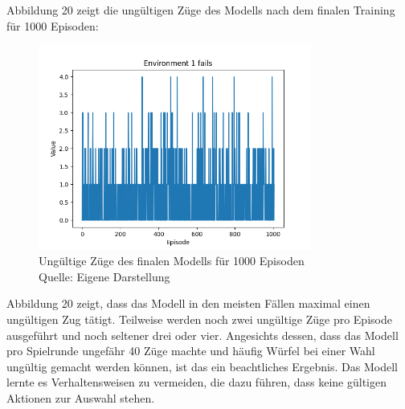 Abbildung 20 zeigt die ungültigen Züge des Modells nach dem finalen Training für 1000 Episoden:
\nopagebreak
\begin{figure}[H]
	\centering
	\includegraphics[width=0.8\textwidth]{Bilder/maskableppo_ganzschoenclever_193avg_v3.1f}
	\caption[Ungültige Züge des finalen Modells für 1000 Episoden]{Ungültige Züge des finalen Modells für 1000 Episoden\\ Quelle: Eigene Darstellung}
\end{figure}

Abbildung 20 zeigt, dass das Modell in den meisten Fällen maximal einen ungültigen Zug tätigt. Teilweise werden noch zwei ungültige Züge pro Episode ausgeführt und noch seltener drei oder vier. Angesichts dessen, dass das Modell pro Spielrunde ungefähr 40 Züge machte und häufig Würfel bei einer Wahl ungültig gemacht werden können, ist das ein beachtliches Ergebnis. Das Modell lernte es Verhaltensweisen zu vermeiden, die dazu führen, dass keine gültigen Aktionen zur Auswahl stehen.\\

